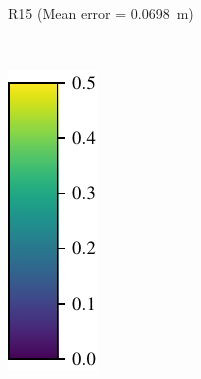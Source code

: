 \begin{figure}[tpbh!]
\begin{center}
\begin{subfigure}[b]{0.3\textwidth}
			\label{fig:r15_pcl}
			\caption{R15 (Mean error = \SI{0.0698}{m})}
			\vspace{0.2in}
		\end{subfigure}%
		~
		\begin{subfigure}[b]{0.07\textwidth}
			\includegraphics[width=\linewidth]{figs/run10_init_fail/colorbar.pdf}

\end{subfigure}
\end{center}
\end{figure}

